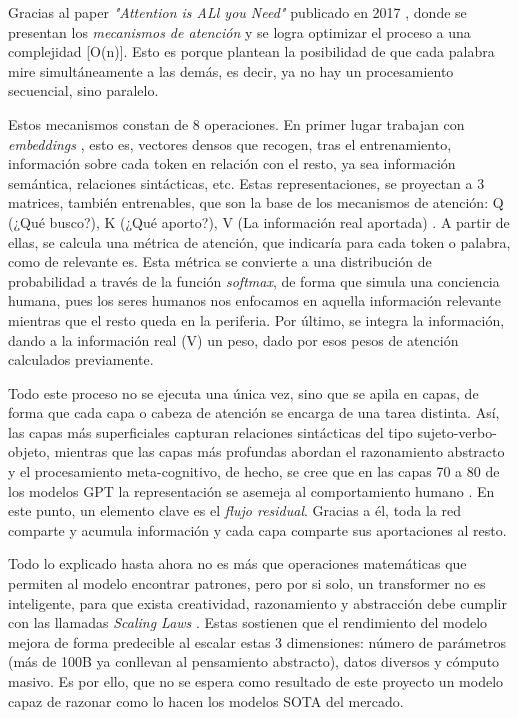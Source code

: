 \documentclass[11pt]{book}
\theoremstyle{plain}
\theoremstyle{definition}
\begin{document}
Gracias al paper \textit{"Attention is ALl you Need"} publicado en 2017 \parencite{vaswani2017attention}, donde se presentan los \textit{mecanismos de atención} y se logra optimizar el proceso a una complejidad [O(n)]. Esto es porque plantean la posibilidad de que cada palabra mire simultáneamente a las demás, es decir, ya no hay un procesamiento secuencial, sino paralelo. 

Estos mecanismos constan de 8 operaciones. En primer lugar trabajan con \textit{embeddings} \parencite{neuraforge2023guide}, esto es, vectores densos que recogen, tras el entrenamiento, información sobre cada token en relación con el resto, ya sea información semántica, relaciones sintácticas, etc. Estas representaciones, se proyectan a 3 matrices, también entrenables, que son la base de los mecanismos de atención: Q (¿Qué busco?), K (¿Qué aporto?), V (La información real aportada) \parencite{epichka2023qkv}. A partir de ellas, se calcula una métrica de atención, que indicaría para cada token o palabra, como de relevante es. Esta métrica se convierte a una distribución de probabilidad a través de la función \textit{softmax}, de forma que simula una conciencia humana, pues los seres humanos nos enfocamos en aquella información relevante mientras que el resto queda en la periferia. Por último, se integra la información, dando a la información real (V) un peso, dado por esos pesos de atención calculados previamente.

Todo este proceso no se ejecuta una única vez, sino que se apila en capas, de forma que cada capa o cabeza de atención se encarga de una tarea distinta. Así, las capas más superficiales capturan relaciones sintácticas del tipo sujeto-verbo-objeto, mientras que las capas más profundas abordan el razonamiento abstracto y el procesamiento meta-cognitivo, de hecho, se cree que en las capas 70 a 80 de los modelos GPT la representación se asemeja al comportamiento humano \parencite{plainenglish2021gpt}. En este punto, un elemento clave es el \textit{flujo residual}. Gracias a él, toda la red comparte y acumula información y cada capa comparte sus aportaciones al resto. 

Todo lo explicado hasta ahora no es más que operaciones matemáticas que permiten al modelo encontrar patrones, pero por si solo, un transformer no es inteligente, para que exista creatividad, razonamiento y abstracción debe cumplir con las llamadas \textit{Scaling Laws} \parencite{wolfe_llm_scaling}. Estas sostienen que el rendimiento del modelo mejora de forma predecible al escalar estas 3 dimensiones: número de parámetros (más de 100B ya conllevan al pensamiento abstracto), datos diversos y cómputo masivo. Es por ello, que no se espera como resultado de este proyecto un modelo capaz de razonar como lo hacen los modelos SOTA del mercado.
\end{document}
